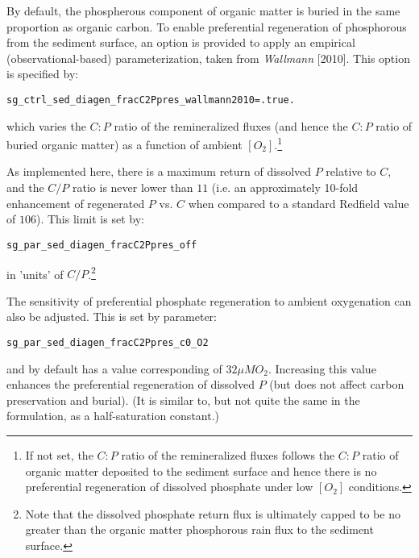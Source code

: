 \begin{enumerate}
By default, the phospherous component of organic matter is buried in the same proportion as organic carbon. To enable preferential regeneration of phosphorous from the sediment surface, an option is provided to apply an empirical (observational-based) parameterization, taken from \textit{Wallmann} [2010]. This option is specified by:
\vspace{-1mm}\small\begin{verbatim}
sg_ctrl_sed_diagen_fracC2Ppres_wallmann2010=.true.
\end{verbatim}\normalsize\vspace{-1mm}
which varies the \(C:P\) ratio of the remineralized fluxes (and hence the \(C:P\) ratio of buried organic matter) as a function of ambient \([O_{2}]\).\footnote{If not set, the \(C:P\) ratio of the remineralized fluxes follows the \(C:P\) ratio of organic matter deposited to the sediment surface and hence there is no preferential regeneration of dissolved phosphate under low \([O_{2}]\) conditions.}

\vspace{1mm}
As implemented here, there is a maximum  return of dissolved \(P\) relative to \(C\), and the \(C/P\) ratio is never lower than \(11\) (i.e. an approximately 10-fold enhancement of regenerated \(P\) vs. \(C\) when compared to a standard Redfield value of \(106\)). This limit is set by:
\vspace{-1mm}\small\begin{verbatim}
sg_par_sed_diagen_fracC2Ppres_off
\end{verbatim}\normalsize\vspace{-1mm}
in 'units' of \(C/P\).\footnote{Note that the dissolved phosphate return flux is ultimately capped to be no greater than the organic matter phosphorous rain flux to the sediment surface.}

\vspace{1mm}
The sensitivity of preferential phosphate regeneration to ambient oxygenation can also be adjusted. This is set by parameter: 
\vspace{-1mm}\small\begin{verbatim}
sg_par_sed_diagen_fracC2Ppres_c0_O2
\end{verbatim}\normalsize\vspace{-1mm}
and by default has a value corresponding of \(32\mu M O_{2}\). Increasing this value enhances the preferential regeneration of dissolved \(P\) (but does not affect carbon preservation and burial). (It is similar to, but not quite the same in the formulation, as a half-saturation constant.)


\end{enumerate}
